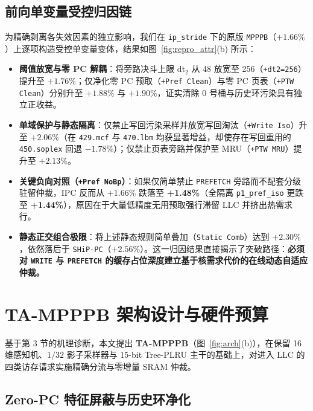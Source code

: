 \documentclass[10.5pt,compsoc,UTF8]{CjC}
\begin{document}
\subsection{前向单变量受控归因链}

为精确剥离各失效因素的独立影响，我们在 \texttt{ip\_stride} 下的原版 \texttt{MPPPB}（$+1.66\%$）上逐项构造受控单变量变体，结果如图~\ref{fig:repro_attr}(b) 所示：
\begin{itemize}
  \item \textbf{阈值放宽与零 PC 解耦}：将旁路决斗上限 $\mathrm{dt}_2$ 从 48 放宽至 256（\texttt{+dt2=256}）提升至 $+1.76\%$；仅净化零 PC 预取（\texttt{+Pref Clean}）与零 PC 页表（\texttt{+PTW Clean}）分别升至 $+1.88\%$ 与 $+1.90\%$，证实清除 0 号桶与历史环污染具有独立正收益。
  \item \textbf{单域保护与静态隔离}：仅禁止写回污染采样并放宽写回淘汰（\texttt{+Write Iso}）升至 $+2.06\%$（在 \texttt{429.mcf} 与 \texttt{470.lbm} 均获显著增益，却使存在写回重用的 \texttt{450.soplex} 回退 $-1.78\%$）；仅禁止页表旁路并保护至 MRU（\texttt{+PTW MRU}）提升至 $+2.13\%$。
  \item \textbf{关键负向对照（\texttt{+Pref NoBp}）}：如果仅简单禁止 \texttt{PREFETCH} 旁路而不配套分级驻留仲裁，IPC 反而从 $+1.66\%$ 跌落至 \textbf{+1.48\%}（全隔离 \texttt{p1\_pref\_iso} 更跌至 \textbf{+1.44\%}），原因在于大量低精度无用预取强行滞留 LLC 并挤出热需求行。
  \item \textbf{静态正交组合极限}：将上述静态规则简单叠加（\texttt{Static Comb}）达到 $+2.30\%$，依然落后于 \texttt{SHiP-PC}（$+2.56\%$）。这一归因结果直接揭示了突破路径：\textbf{必须对 \texttt{WRITE} 与 \texttt{PREFETCH} 的缓存占位深度建立基于核需求代价的在线动态自适应仲裁。}
\end{itemize}

\section{TA-MPPPB 架构设计与硬件预算}

基于第 3 节的机理诊断，本文提出 \textbf{TA-MPPPB}（图~\ref{fig:arch}(b)），在保留 16 维感知机、$1/32$ 影子采样器与 15-bit Tree-PLRU 主干的基础上，对进入 LLC 的四类访存请求实施精确分流与零增量 SRAM 仲裁。

\subsection{Zero-PC 特征屏蔽与历史环净化}
\end{document}
